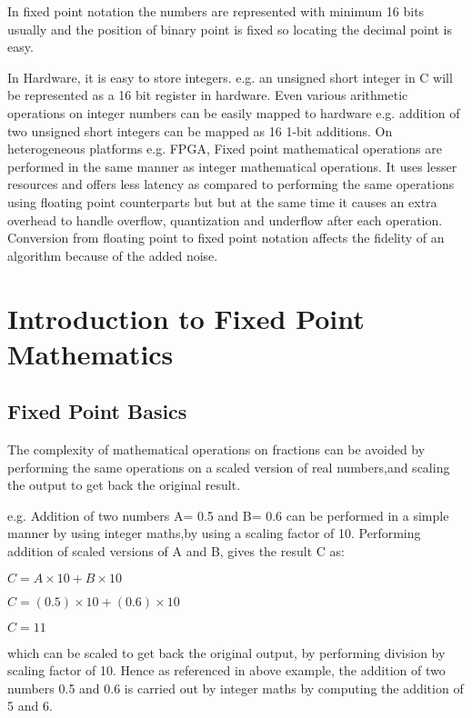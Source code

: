 \vspace{0.25cm}
\noindent In fixed point notation the numbers are represented with minimum 16 bits usually and the position of binary point is fixed so locating the decimal point is easy.

\vspace{0.25cm}
 \noindent In Hardware, it is easy to store integers. e.g. an unsigned short integer in C will be represented as a 16 bit register in hardware. Even various arithmetic operations on integer numbers can be easily mapped to hardware e.g. addition of two unsigned short integers can be mapped as 16 1-bit additions. On heterogeneous platforms e.g. FPGA, Fixed point mathematical operations are performed in the same manner as integer mathematical operations. It uses lesser resources and offers less latency as compared to performing the same operations using floating point counterparts but but at the same time it causes an extra overhead to handle overflow, quantization and underflow after each operation. Conversion from floating point to fixed point notation affects the fidelity of an algorithm because of the added noise.

\section{Introduction to Fixed Point Mathematics}
\subsection{Fixed Point Basics}
The complexity of mathematical operations on fractions can be avoided by performing the same operations on a scaled version of real numbers,and scaling the output to get back the original result.

\vspace{0.25cm}
\noindent e.g. Addition of two numbers A= 0.5 and B= 0.6  can be performed in a simple manner by using integer maths,by using a scaling factor of 10. Performing addition of scaled versions of A and B, gives the result C as:

\noindent$C= A\times 10+ B\times 10$ 

\noindent $C= (0.5)\times 10+ (0.6)\times 10$

\noindent $C=11$

\noindent which can be scaled to get back the original output, by performing division by scaling factor of 10. Hence as referenced in above example, the addition of two numbers 0.5 and 0.6 is carried out by integer maths by computing the addition of 5 and 6.

